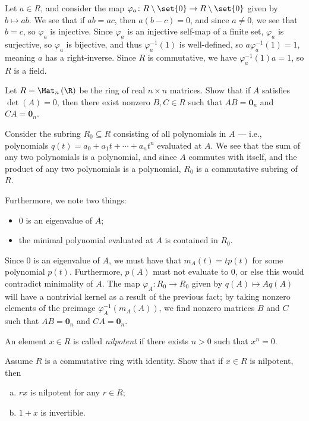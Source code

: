 \documentclass[10pt]{mypackage}
\begin{document}
\begin{solution}
  Let $a\in R$, and consider the map $\varphi_{a}\colon R\setminus \set{0} \rightarrow R\setminus \set{0}$ given by $b\mapsto ab$. We see that if $ab = ac$, then $a\left( b-c \right) = 0$, and since $a\neq 0$, we see that $b = c$, so $\varphi_{a}$ is injective. Since $\varphi_a$ is an injective self-map of a finite set, $\varphi_a$ is surjective, so $\varphi_{a}$ is bijective, and thus $\varphi_a^{-1}\left( 1 \right)$ is well-defined, so $a\varphi_{a}^{-1}\left( 1 \right) = 1$, meaning $a$ has a right-inverse. Since $R$ is commutative, we have $\varphi_{a}^{-1}\left( 1 \right)a = 1$, so $R$ is a field.
\end{solution}
\begin{problem}[Problem 5]
  Let $ R = \Mat_{n}\left( \R \right) $ be the ring of real $n\times n$ matrices. Show that if $A$ satisfies $\det\left( A \right) = 0$, then there exist nonzero $B,C\in R$ such that $AB = \mathbf{0}_{n}$ and $CA = \mathbf{0}_{n}$.
\end{problem}
\begin{solution}
  Consider the subring $R_0\subseteq R$ consisting of all polynomials in $A$ --- i.e., polynomials $q(t)= a_0 + a_1 t + \cdots + a_nt^{n}$ evaluated at $A$. We see that the sum of any two polynomials is a polynomial, and since $A$ commutes with itself, and the product of any two polynomials is a polynomial, $R_0$ is a commutative subring of $R$.

  Furthermore, we note two things:
  \begin{itemize}
    \item $0$ is an eigenvalue of $A$;
    \item the minimal polynomial evaluated at $A$ is contained in $R_0$.
  \end{itemize}
  Since $0$ is an eigenvalue of $A$, we must have that $m_A(t) = t p(t)$ for some polynomial $p(t)$. Furthermore, $p(A)$ must not evaluate to $0$, or else this would contradict minimality of $A$. The map $\varphi_{A}\colon R_0\rightarrow R_0$ given by $q(A) \mapsto Aq(A)$ will have a nontrivial kernel as a result of the previous fact; by taking nonzero elements of the preimage $\varphi_{A}^{-1}\left( m_A(A) \right)$, we find nonzero matrices $B$ and $C$ such that $AB = \mathbf{0}_{n}$ and $CA = \mathbf{0}_{n}$.
\end{solution}
\begin{problem}[Problem 6]
  An element $x\in R$ is called \textit{nilpotent} if there exists $n > 0$ such that $x^{n} = 0$.\newline

  Assume $R$ is a commutative ring with identity. Show that if $x\in R$ is nilpotent, then
  \begin{enumerate}[(a)]
    \item $rx$ is nilpotent for any $r\in R$;
    \item $1+x$ is invertible.
  \end{enumerate}
\end{problem}
\end{document}
